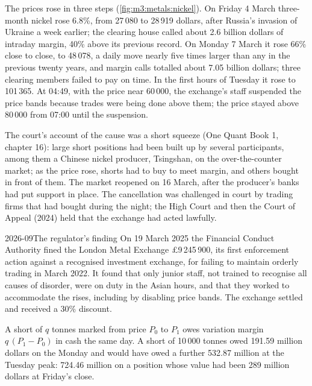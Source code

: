 The prices rose in three steps (\cref{fig:m3:metals:nickel}). On Friday 4 March three-month
nickel rose 6.8\%, from 27\,080 to 28\,919 dollars, after Russia's invasion of Ukraine a week
earlier; the clearing house called about 2.6 billion dollars of intraday margin, 40\% above its
previous record. On Monday 7 March it rose 66\% close to close, to 48\,078, a daily move nearly
five times larger than any in the previous twenty years, and margin calls totalled about 7.05
billion dollars; three clearing members failed to pay on time. In the first hours of Tuesday it
rose to 101\,365. At 04:49, with the price near 60\,000, the exchange's staff suspended the
price bands because trades were being done above them; the price stayed above 80\,000 from
07:00 until the suspension.

The court's account of the cause was a short squeeze (One Quant Book 1, chapter 16): large short
positions had been built up by several participants, among them a Chinese nickel producer,
Tsingshan, on the over-the-counter market; as the price rose, shorts had to buy to meet margin,
and others bought in front of them. The market reopened on 16 March, after the producer's banks
had put support in place. The cancellation was challenged in court by trading firms that had
bought during the night; the High Court and then the Court of Appeal (2024) held that the
exchange had acted lawfully.

\begin{dated}{2026-09}{The regulator's finding}\label{dat:m3:metals:fca}
On 19 March 2025 the Financial Conduct Authority fined the London Metal Exchange
\pounds9\,245\,900, its first enforcement action against a recognised investment exchange, for
failing to maintain orderly trading in March 2022. It found that only junior staff, not trained
to recognise all causes of disorder, were on duty in the Asian hours, and that they worked to
accommodate the rises, including by disabling price bands. The exchange settled and received a
30\% discount.
\end{dated}

\begin{proposition}\label{prop:m3:metals:margin}
A short of $q$ tonnes marked from price $P_0$ to $P_1$ owes variation margin $q\,(P_1 - P_0)$ in
cash the same day. A short of 10\,000 tonnes owed 191.59 million dollars on the Monday and
would have owed a further 532.87 million at the Tuesday peak: 724.46 million on a position
whose value had been 289 million dollars at Friday's close.
\end{proposition}


